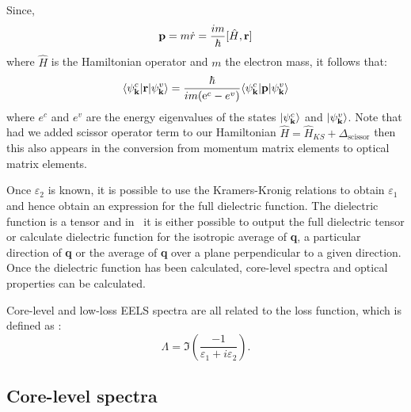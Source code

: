 \documentclass[a4paper,11pt,twoside]{book}
\newcommand{\e}{\mathrm{e}}
\begin{document}
Since,
\begin{equation}
{\bf p} = m\dot{r} =\frac{im}{\hbar} [\hat{H},{\bf r}]
\label{Eqn:velocity_op}
\end{equation}
where $\hat{H}$ is the Hamiltonian operator and $m$ the electron mass, it follows that:
\begin{equation}
\langle \psi^c_{\bf k}  |  {\bf r} | \psi^v_{\bf k} \rangle = \frac{\hbar} {im (\e^c-e^v)} \langle \psi^c_{\bf k}  |  {\bf p} | \psi^v_{\bf k} \rangle
\label{Eqn:pvr}
\end{equation}
where $e^c$ and $e^v$ are the energy eigenvalues of the states $|\psi^c_{\bf k} \rangle$ and $|\psi^v_{\bf k} \rangle$.
%
Note that had we added scissor operator term to our Hamiltonian $\hat{H} = \hat{H}_{KS} + \Delta_{\mathrm{scissor}}$ then this also appears in the conversion from momentum matrix elements to optical matrix elements.

Once $\varepsilon_2$ is known, it is possible to use the Kramers-Kronig relations to obtain $\varepsilon_1$ and hence obtain an expression for the full dielectric function.  The dielectric function is a tensor and in \optados\ it is either possible to output the full dielectric tensor or calculate dielectric function for the isotropic average of {\bf q}, a particular direction of {\bf q} or the average of {\bf q} over a plane perpendicular to a given direction.  Once the dielectric function has been calculated, core-level spectra and optical properties can be calculated.  

Core-level and low-loss EELS spectra are all related to the loss function, which is defined as \cite{egerton}:
\begin{equation}
\Lambda = \Im \left ( \frac{-1}{\varepsilon_1 + i\varepsilon_2  } \right ).
\label{Eqn:LossFn}
\end{equation}


\subsection{Core-level spectra}
\end{document}
